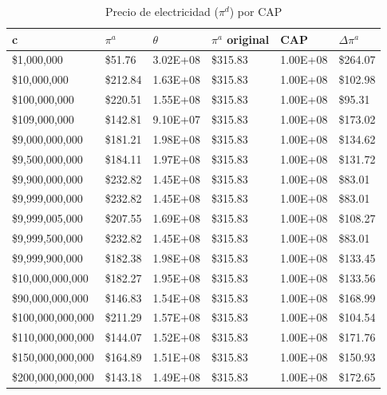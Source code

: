 \begin{table}[H]
    \centering
    \begin{tabular}{|l|l|l|l|l|l|}
    \hline
        c & $\pi^a$ & $\theta$ & $\pi^a$ original &  CAP& $\Delta \pi^a$    \\ \hline
         \$1,000,000  &  \$51.76  & 3.02E+08 &  \$315.83  & 1.00E+08 &  \$264.07   \\ \hline
         \$10,000,000  &  \$212.84  & 1.63E+08 &  \$315.83  & 1.00E+08 &  \$102.98   \\ \hline
         \$100,000,000  &  \$220.51  & 1.55E+08 &  \$315.83  & 1.00E+08 &  \$95.31   \\ \hline
         \$109,000,000  &  \$142.81  & 9.10E+07 &  \$315.83  & 1.00E+08 &  \$173.02   \\ \hline
         \$9,000,000,000  &  \$181.21  & 1.98E+08 &  \$315.83  & 1.00E+08 &  \$134.62   \\ \hline
         \$9,500,000,000  &  \$184.11  & 1.97E+08 &  \$315.83  & 1.00E+08 &  \$131.72   \\ \hline
         \$9,900,000,000  &  \$232.82  & 1.45E+08 &  \$315.83  & 1.00E+08 &  \$83.01   \\ \hline
         \$9,999,000,000  &  \$232.82  & 1.45E+08 &  \$315.83  & 1.00E+08 &  \$83.01   \\ \hline
         \$9,999,005,000  &  \$207.55  & 1.69E+08 &  \$315.83  & 1.00E+08 &  \$108.27   \\ \hline
         \$9,999,500,000  &  \$232.82  & 1.45E+08 &  \$315.83  & 1.00E+08 &  \$83.01   \\ \hline
         \$9,999,900,000  &  \$182.38  & 1.98E+08 &  \$315.83  & 1.00E+08 &  \$133.45   \\ \hline
         \$10,000,000,000  &  \$182.27  & 1.95E+08 &  \$315.83  & 1.00E+08 &  \$133.56   \\ \hline
         \$90,000,000,000  &  \$146.83  & 1.54E+08 &  \$315.83  & 1.00E+08 &  \$168.99   \\ \hline
         \$100,000,000,000  &  \$211.29  & 1.57E+08 &  \$315.83  & 1.00E+08 &  \$104.54   \\ \hline
         \$110,000,000,000  &  \$144.07  & 1.52E+08 &  \$315.83  & 1.00E+08 &  \$171.76   \\ \hline
         \$150,000,000,000  &  \$164.89  & 1.51E+08 &  \$315.83  & 1.00E+08 &  \$150.93   \\ \hline
         \$200,000,000,000  &  \$143.18  & 1.49E+08 &  \$315.83  & 1.00E+08 &  \$172.65   \\ \hline
    \end{tabular}
    \caption{{\footnotesize Precio de electricidad ($\pi^d$) por CAP}}
    \label{calibracioncuadrado}
\end{table}

